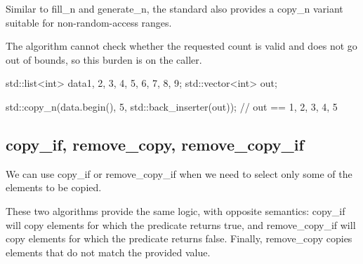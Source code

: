 Similar to fill\_n and generate\_n, the standard also provides a copy\_n variant suitable for non-random-access ranges.



The algorithm cannot check whether the requested count is valid and does not go out of bounds, so this burden is on the caller.

\begin{box-note}
\begin{cppcode}
std::list<int> data{1, 2, 3, 4, 5, 6, 7, 8, 9};
std::vector<int> out;

std::copy_n(data.begin(), 5, std::back_inserter(out));
// out == { 1, 2, 3, 4, 5 }
\end{cppcode}
\end{box-note}

\subsection{copy\_if, remove\_copy, remove\_copy\_if}

We can use copy\_if or remove\_copy\_if when we need to select only some of the elements to be copied.



These two algorithms provide the same logic, with opposite semantics: copy\_if will copy elements for which the predicate returns true, and remove\_copy\_if will copy elements for which the predicate returns false. Finally, remove\_copy copies elements that do not match the provided value.

\begin{box-note}
\end{box-note}

